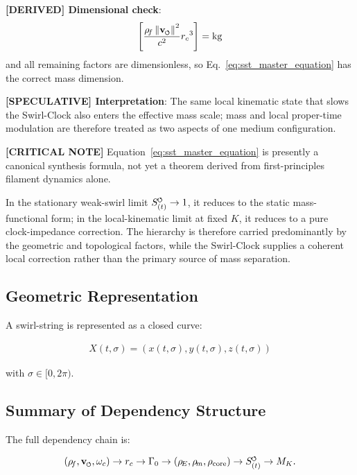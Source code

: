 \documentclass[11pt]{article}
\theoremstyle{definition}
\theoremstyle{plain}
\theoremstyle{remark}
\newcommand{\swirlarrow}{\mathchoice{\mkern-2mu\scriptstyle\boldsymbol{\circlearrowleft}}{\mkern-2mu\scriptstyle\boldsymbol{\circlearrowleft}}{\mkern-2mu\scriptscriptstyle\boldsymbol{\circlearrowleft}}{\mkern-2mu\scriptscriptstyle\boldsymbol{\circlearrowleft}}}
\newcommand{\vswirl}{\mathbf{v}_{\swirlarrow}}
\newcommand{\rhoF}{{\rho_{\!f}}}
\newcommand{\rhoE}{\rho_{\!E}}
\newcommand{\rhoM}{\rho_{\!m}}
\newcommand{\rhocore}{\rho_{\mathrm{core}}}
\newcommand{\SwirlClock}{{S_{(t)}^{\swirlarrow}}}
\newcommand{\rc}{{r_c}}
\begin{document}
        \textbf{[DERIVED] Dimensional check}:
        \begin{align}
            \left[ \frac{\rhoF\,\norm{\vswirl}^2}{c^2} \rc^3 \right] = \mathrm{kg}
        \end{align}
        and all remaining factors are dimensionless, so Eq.~\ref{eq:sst_master_equation} has the correct mass dimension.

        \textbf{[SPECULATIVE] Interpretation}: The same local kinematic state that slows the Swirl-Clock also enters the effective mass scale; mass and local proper-time modulation are therefore treated as two aspects of one medium configuration.

        \textbf{[CRITICAL NOTE]} Equation~\eqref{eq:sst_master_equation} is presently a canonical synthesis formula, not yet a theorem derived from first-principles filament dynamics alone.

        In the stationary weak-swirl limit $\SwirlClock \to 1$, it reduces to the static mass-functional form; in the local-kinematic limit at fixed $K$, it reduces to a pure clock-impedance correction. The hierarchy is therefore carried predominantly by the geometric and topological factors, while the Swirl-Clock supplies a coherent local correction rather than the primary source of mass separation.

    \subsection{Geometric Representation}
        
        A swirl-string is represented as a closed curve:
        
        \begin{align}
            X(t,\sigma) = (x(t,\sigma), y(t,\sigma), z(t,\sigma))
        \end{align}
        
        with $\sigma \in [0,2\pi)$.
    
    \subsection{Summary of Dependency Structure}
        
        The full dependency chain is:
        
        \begin{align}
        (\rhoF, \vswirl, \omega_c)
            \rightarrow \rc
            \rightarrow \Gamma_0
            \rightarrow (\rhoE, \rhoM, \rhocore)
            \rightarrow \SwirlClock
            \rightarrow M_K.
        \end{align}
        
\end{document}
